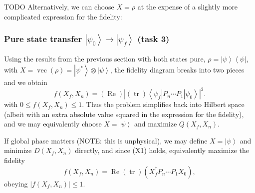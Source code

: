 \documentclass[aps, pra, a4paper, longbibliography]{revtex4}
\newcommand{\be}{\begin{equation}}
\newcommand{\ee}{\end{equation}}
\newcommand{\ket}[1]{\left| #1 \right \rangle}
\newcommand{\bra}[1]{\left \langle #1 \right|}
\newcommand{\ketbra}[2]{\left| #1 \right \rangle \left \langle #2 \right|}
\DeclareMathOperator{\tr}{tr}
\DeclareMathOperator{\re}{Re}
\DeclareMathOperator{\cvec}{vec}
\newcommand{\dd}[2]{\frac{\mathrm{d} #1}{\mathrm{d} #2}}
\begin{document}
TODO
Alternatively, we can choose $X = \rho$ at the expense of a slightly
more complicated expression for the fidelity:
\begin{comment}
\be
f(X_f, X_n)
= \frac{1}{P(X_f)} (\re) \tr(X_f^\dagger X_n)
= \frac{1}{P(X_f)} (\re) \tr(X_f^\dagger  P_n ... P_1 X_0 P_1^\dagger ... P_n^\dagger)
\ee

\be
X_i := \left(\prod_{j=1}^{i} P_j\right) X_0 \left(\prod_{j=1}^{i} P_j\right)^\dagger
\ee

\begin{align}
\dd{f(X_f, X_n)}{u(t_j)}
&= \re \left(\dd{g}{u(t_j)} \right)
= \frac{1}{P(X_f)} (\re) \tr \left(X_f \dd{X_n}{u(t_j)}\right)\\
&= \frac{1}{P(X_f)} \left(\tr \left(X_f P_n \cdots \dd{P_j}{u(t_j)} \cdots P_1 X_0 P^\dagger_1 \cdots P^\dagger_n\right)
+\tr\left(X_f P_n \cdots P_1 X_0 P^\dagger_1 \cdots \dd{P^\dagger(t_j)}{u(t_j)} \cdots P^\dagger_n\right)\right)\\
&= \frac{2}{P(X_f)} \re \tr\left(X_f P_n \cdots \dd{P_j}{u(t_j)} \cdots P_1 X_0 P^\dagger_1 \cdots P^\dagger_n\right).
\end{align}
NOTE: last line not in paper!
\end{comment}



\subsubsection{Pure state transfer $\ket{\psi_0} \to \ket{\psi_f}$ (task 3)}
\label{sec:closed-pure}

Using the results from the previous section with both states pure,
$\rho = \ketbra{\psi}{\psi}$, with
$X = \cvec(\rho) = \ket{\psi^*} \otimes \ket{\psi}$,
the fidelity diagram breaks into two pieces and
we obtain
\be
f(X_f, X_n)
= (\re) \left|(\tr) \bra{\psi_f}  P_n \cdots P_1 \ket{\psi_0} \right|^2.
\ee
with $0 \le f(X_f, X_n) \le 1$.
Thus the problem simplifies back into Hilbert space
(albeit with an extra absolute value squared in the expression for the fidelity), and we may equivalently
choose $X = \ket{\psi}$ and maximize $Q(X_f, X_n)$.




If global phase matters (NOTE: this is unphysical), we may define $X = \ket{\psi}$ and minimize
$D(X_f, X_n)$ directly, and since (X1) holds,
equivalently maximize the fidelity
\be
f(X_f, X_n)
= \re (\tr) \left(X_f^\dagger P_n \cdots P_1 X_0 \right),
\ee
obeying
$|f(X_f, X_n)| \le 1$.
\end{document}
